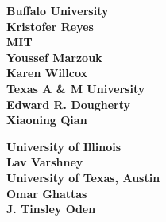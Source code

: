 \documentclass[11pt]{article}
\begin{document}
\vskip 0.25in
\bf{Buffalo University}\\
Kristofer Reyes \\

\vskip 0.25in
\bf{MIT}\\
Youssef Marzouk\\
Karen Willcox\\

\vskip 0.25in
\bf{Texas A \& M University}\\
Edward R. Dougherty\\
Xiaoning Qian 

\vskip 0.25in
\bf{University of Illinois}\\
Lav Varshney \\

\vskip 0.25in
\bf{University of Texas, Austin}\\
Omar Ghattas\\
J. Tinsley Oden
\end{document}
